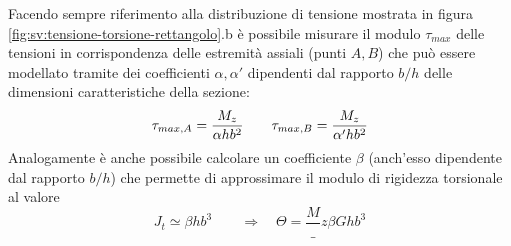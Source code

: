     		Facendo sempre riferimento alla distribuzione di tensione mostrata in figura \ref{fig:sv:tensione-torsione-rettangolo}.b è possibile misurare il modulo $\tau_{max}$ delle tensioni in corrispondenza delle estremità assiali (punti $A,B$) che può essere modellato tramite dei coefficienti $\alpha,\alpha'$ dipendenti dal rapporto $b/h$ delle dimensioni caratteristiche della sezione:
    		\[ \tau_{max,A} = \frac{M_z}{\alpha h b^2} \qquad \tau_{max,B} = \frac{M_z}{\alpha'hb^2}  \]
    		Analogamente è anche possibile calcolare un coefficiente $\beta$ (anch'esso dipendente dal rapporto $b/h$) che permette di approssimare il modulo di rigidezza torsionale al valore
    		\[ J_t \simeq \beta h b^3 \qquad \Rightarrow \quad \Theta = \frac M_z {\beta G hb^3}  \]
    		
    	
    	
    	
    	
    	
    	
    	
    	
    	
    	
    	
    	
    	
    	
    	
    	
    	
    